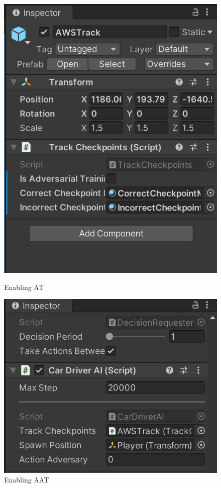 \begin{figure}[H]
    \centering
    \begin{minipage}[b]{0.45\textwidth}
    \includegraphics[width=\textwidth]{images/AT-console.png}
    \caption{Enabling AT}
    \label{fig:AT-Console}
  \end{minipage}
  \hfill
  \begin{minipage}[b]{0.45\textwidth}
    \includegraphics[width=\textwidth]{images/AAT-console.png}
    \caption{Enabling AAT}
    \label{fig:AAT-Console}
  \end{minipage}
\end{figure}


